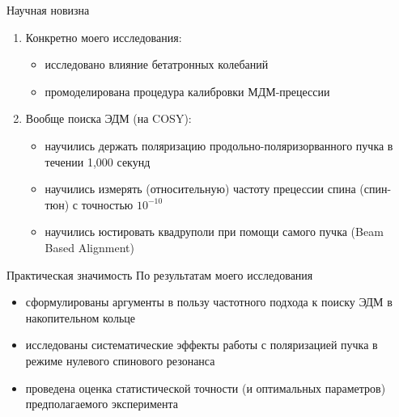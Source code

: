 \documentclass[14pt]{beamer}
\begin{document}
\begin{frame}{Научная новизна}
	\begin{enumerate}[<+->]
		\item Конкретно моего исследования: 
			\begin{itemize}
				\item исследовано влияние бетатронных колебаний
				\item промоделирована процедура калибровки МДМ-прецессии
			\end{itemize}
		\item Вообще поиска ЭДМ (на COSY): 
		\begin{itemize}
			\item научились держать поляризацию продольно-поляризорванного пучка в течении 1,000 секунд
			\item научились измерять (относительную) частоту прецессии спина (спин-тюн) с точностью $10^{-10}$
			\item научились юстировать квадруполи при помощи самого пучка (Beam Based Alignment)
		\end{itemize}
	\end{enumerate}
\end{frame}

\begin{frame}{Практическая значимость}
	По результатам моего исследования 
	\begin{itemize}
		\item сформулированы аргументы в пользу частотного подхода к поиску ЭДМ в накопительном кольце
		\item исследованы систематические эффекты работы с поляризацией пучка в режиме нулевого спинового резонанса
		\item проведена оценка статистической точности (и оптимальных параметров) предполагаемого эксперимента
	\end{itemize}
\end{frame}
\end{document}
